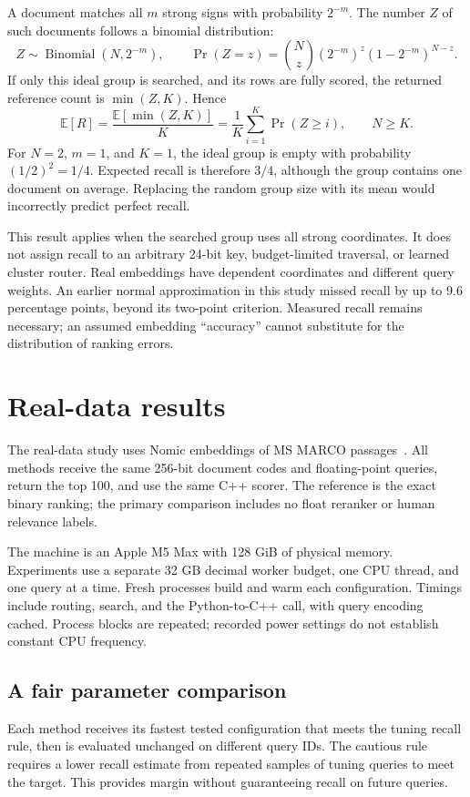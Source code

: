 \documentclass[11pt,a4paper]{article}
\newcommand{\E}{\mathbb E}
\begin{document}
A document matches all $m$ strong signs with probability $2^{-m}$. The number $Z$ of such
documents follows a binomial distribution:
\begin{equation}
 Z\sim\operatorname{Binomial}(N,2^{-m}),\qquad
 \Pr(Z=z)=\binom Nz(2^{-m})^z(1-2^{-m})^{N-z}.
\end{equation}
If only this ideal group is searched, and its rows are fully scored, the returned reference
count is $\min(Z,K)$. Hence
\begin{equation}
 \E[R]=\frac{\E[\min(Z,K)]}{K}
       =\frac1K\sum_{i=1}^{K}\Pr(Z\ge i),\qquad N\ge K.
 \label{eq:recall}
\end{equation}
For $N=2$, $m=1$, and $K=1$, the ideal group is empty with probability $(1/2)^2=1/4$.
Expected recall is therefore $3/4$, although the group contains one document on average.
Replacing the random group size with its mean would incorrectly predict perfect recall.

This result applies when the searched group uses all strong coordinates. It does not assign
recall to an arbitrary 24-bit key, budget-limited traversal, or learned cluster router.
Real embeddings have dependent coordinates and different query weights. An earlier normal
approximation in this study missed recall by up to 9.6 percentage points, beyond its
two-point criterion. Measured recall remains necessary; an assumed embedding ``accuracy''
cannot substitute for the distribution of ranking errors.

\newpage
\section{Real-data results}
The real-data study uses Nomic embeddings of MS MARCO passages~\cite{msmarco,nomic}.
All methods receive the same 256-bit document codes and floating-point queries, return the
top 100, and use the same C++ scorer. The reference is the exact binary ranking; the primary
comparison includes no float reranker or human relevance labels.

The machine is an Apple M5 Max with 128 GiB of physical memory. Experiments use a separate
32 GB decimal worker budget, one CPU thread, and one query at a time. Fresh processes build
and warm each configuration. Timings include routing, search, and the Python-to-C++ call,
with query encoding cached. Process blocks are repeated; recorded power settings do not
establish constant CPU frequency.

\subsection{A fair parameter comparison}
Each method receives its fastest tested configuration that meets the tuning recall rule,
then is evaluated unchanged on different query IDs. The cautious rule requires a lower
recall estimate from repeated samples of tuning queries to meet the target. This provides
margin without guaranteeing recall on future queries.
\end{document}
